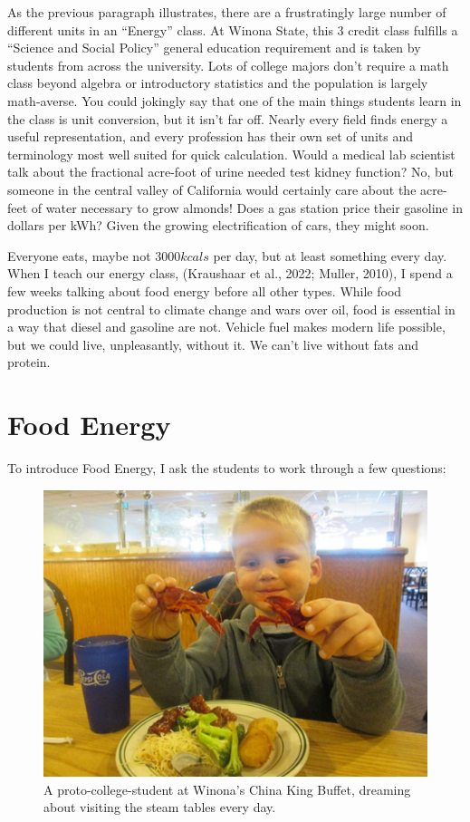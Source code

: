 \documentclass[man]{apa7}
\begin{document}
As the previous paragraph illustrates, there are a frustratingly large number of different units in an ``Energy'' class.  At 
Winona 
State, this 3 credit class fulfills a ``Science and Social Policy'' general education requirement and is taken by students from across the university.   Lots of college majors don't require a math class beyond algebra or introductory statistics and the population is largely math-averse. You could jokingly say that one of the main things students learn in the class is unit conversion, but it isn't far off.  Nearly every field finds energy a useful representation, and every profession has their own set of units and terminology most well suited for quick calculation.  Would a medical lab scientist talk about the fractional acre-foot of urine needed test kidney function?  No, but someone in the central valley of California would certainly care about the acre-feet of water necessary to grow almonds!  Does a gas station price their gasoline in dollars per kWh? Given the growing electrification of cars, they might soon.

Everyone eats, maybe not $3000 kcals$ per day, but at least something every day.  When I teach our energy class, (Kraushaar et al., 2022; Muller, 2010),
I spend a few weeks talking about food energy before all other types.  While food production is not central to climate change and wars over oil, food is essential in a way that diesel and gasoline are not.  Vehicle fuel makes modern life possible, but we could live, unpleasantly, without it.  We can't live without fats and protein.  

\section{Food Energy}

To introduce Food Energy, I ask the students to work through a few questions:

\begin{figure}[h]
\centering
\includegraphics[width=\columnwidth]{at_the_buffet.jpg}
\caption{
A proto-college-student at 
Winona's China King Buffet, dreaming about visiting the steam tables every day. 
}
\label{buffet}
\end{figure}
\end{document}
